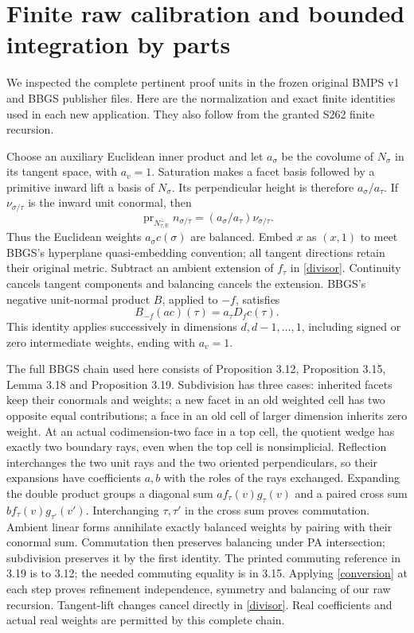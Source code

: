 \documentclass[11pt]{article}
\newcommand{\R}{\mathbb R}
\begin{document}
\section{Finite raw calibration and bounded integration by parts}
We inspected the complete pertinent proof units in the frozen original
BMPS v1 and BBGS publisher files. Here are the normalization and exact
finite identities used in each new application. They also follow from
the granted S262 finite recursion.

Choose an auxiliary Euclidean inner product and let $a_\sigma$ be the
covolume of $N_\sigma$ in its tangent space, with $a_v=1$. Saturation
makes a facet basis followed by a primitive inward lift a basis of
$N_\sigma$. Its perpendicular height is therefore $a_\sigma/a_\tau$.
If $\nu_{\sigma/\tau}$ is the inward unit conormal, then
\[
 \operatorname{pr}_{N_{\tau,\R}^{\perp}}n_{\sigma/\tau}
             =(a_\sigma/a_\tau)\nu_{\sigma/\tau}.
\]
Thus the Euclidean weights $a_\sigma c(\sigma)$ are balanced. Embed
$x$ as $(x,1)$ to meet BBGS's hyperplane quasi-embedding convention;
all tangent directions retain their original metric. Subtract an
ambient extension of $f_\tau$ in \eqref{divisor}. Continuity cancels
tangent components and balancing cancels the extension. BBGS's negative
unit-normal product $B$, applied to $-f$, satisfies
\begin{equation}\label{conversion}
 B_{-f}(ac)(\tau)=a_\tau D_f c(\tau).
\end{equation}
This identity applies successively in dimensions $d,d-1,\ldots,1$,
including signed or zero intermediate weights, ending with $a_v=1$.

The full BBGS chain used here consists of Proposition 3.12, Proposition
3.15, Lemma 3.18 and Proposition 3.19. Subdivision has three cases:
inherited facets keep their conormals and weights; a new facet in an
old weighted cell has two opposite equal contributions; a face in an
old cell of larger dimension inherits zero weight. At an actual
codimension-two face in a top cell, the quotient wedge has exactly two
boundary rays, even when the top cell is nonsimplicial. Reflection
interchanges the two unit rays and the two oriented perpendiculars,
so their expansions have coefficients $a,b$ with the roles of the
rays exchanged. Expanding the double product groups a diagonal sum
$a f_\tau(v)g_\tau(v)$ and a paired cross sum
$b f_\tau(v)g_{\tau'}(v')$. Interchanging $\tau,\tau'$ in the cross
sum proves commutation. Ambient linear forms annihilate exactly
balanced weights by pairing with their conormal sum. Commutation then
preserves balancing under PA intersection; subdivision preserves it
by the first identity. The printed commuting reference in 3.19 is to
3.12; the needed commuting equality is in 3.15. Applying
\eqref{conversion} at each step proves refinement independence,
symmetry and balancing of our raw recursion. Tangent-lift changes
cancel directly in \eqref{divisor}. Real coefficients and actual real
weights are permitted by this complete chain.
\end{document}
